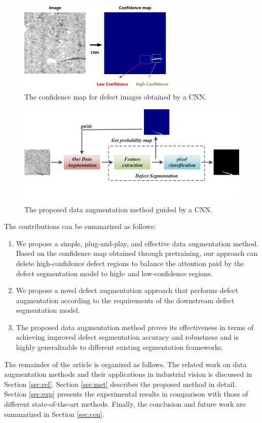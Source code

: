 \documentclass[sn-mathphys]{sn-jnl}%
\theoremstyle{thmstyleone}%
\theoremstyle{thmstyletwo}%
\theoremstyle{thmstylethree}%
\begin{document}
\begin{figure}
\centering
\includegraphics[width=3in]{fig2.jpg}
\caption{The confidence map for defect images obtained by a CNN.}\label{fig:1.2}
\end{figure}

\begin{figure}
\centering
\includegraphics[width=4.5in]{fig3.jpg}
\caption{The proposed data augmentation method guided by a CNN.}\label{fig:1.3}
\end{figure}


The contributions can be summarized as follows:

\begin{enumerate}[1)]
\item We propose a simple, plug-and-play, and effective data augmentation method. Based on the confidence map obtained through pretraining, our approach can delete high-confidence defect regions to balance the attention paid by the defect segmentation model to high- and low-confidence regions.
\item We propose a novel defect augmentation approach that performs defect augmentation according to the requirements of the downstream defect segmentation model.
\item The proposed data augmentation method proves its effectiveness in terms of achieving improved defect segmentation accuracy and robustness and is highly generalizable to different existing segmentation frameworks.
\end{enumerate}


The remainder of the article is organized as follows. The related work on data augmentation methods and their applications in industrial vision is discussed in Section \ref{sec:rel}. Section \ref{sec:met} describes the proposed method in detail. Section \ref{sec:exp} presents the experimental results in comparison with those of different state-of-the-art methods. Finally, the conclusion and future work are summarized in Section \ref{sec:con}.
\end{document}
